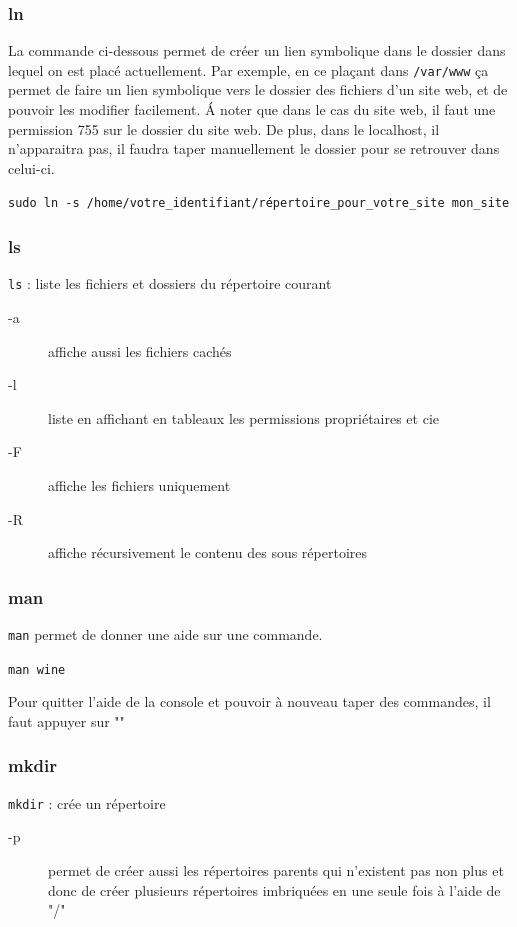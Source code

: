 \documentclass[a4paper,twoside]{article}
\begin{document}
\subsubsection{ln}
La commande ci-dessous permet de créer un lien symbolique dans le dossier dans lequel on est placé actuellement. Par exemple, en ce plaçant dans \verb|/var/www| ça permet de faire un lien symbolique vers le dossier des fichiers d'un site web, et de pouvoir les modifier facilement. \'A noter que dans le cas du site web, il faut une permission 755 sur le dossier du site web. De plus, dans le localhost, il n'apparaitra pas, il faudra taper manuellement le dossier pour se retrouver dans celui-ci.

\verb|sudo ln -s /home/votre_identifiant/répertoire_pour_votre_site mon_site|

\subsubsection{ls}
\verb|ls| : liste les fichiers et dossiers du répertoire courant
\begin{description}
 \item[-a] affiche aussi les fichiers cachés
\item[-l] liste en affichant en tableaux les permissions propriétaires et cie
\item[-F] affiche les fichiers uniquement
\item[-R] affiche récursivement le contenu des sous répertoires
\end{description}

\subsubsection{man}

\verb|man| permet de donner une aide sur une commande.

\begin{exemple}
\texttt{man wine}
\end{exemple}


Pour quitter l'aide de la console et pouvoir à nouveau taper des commandes, il faut appuyer sur ""

\subsubsection{mkdir}
\verb|mkdir| : crée un répertoire
\begin{description}
 \item[-p] permet de créer aussi les répertoires parents qui n'existent pas non plus et donc de créer plusieurs répertoires imbriquées en une seule fois à l'aide de "/"
\end{description}
\end{document}
